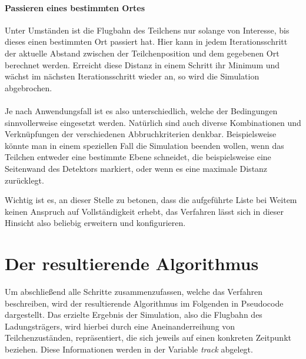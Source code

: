 \paragraph{Passieren eines bestimmten Ortes}
Unter Umst\"anden ist die Flugbahn des Teilchens nur solange von Interesse, bis dieses einen bestimmten Ort passiert hat. Hier
kann in jedem Iterationsschritt der aktuelle Abstand zwischen der Teilchenposition und dem gegebenen Ort berechnet werden.
Erreicht diese Distanz in einem Schritt ihr Minimum und w\"achst im n\"achsten Iterationsschritt wieder an, so wird die
Simulation abgebrochen.
\\
\\
Je nach Anwendungsfall ist es also unterschiedlich, welche der Bedingungen sinnvollerweise eingesetzt werden. Nat\"urlich sind
auch diverse Kombinationen und Verkn\"upfungen der verschiedenen Abbruchkriterien denkbar. Beispielsweise k\"onnte man in einem
speziellen Fall die Simulation beenden wollen, wenn das Teilchen entweder eine bestimmte Ebene schneidet, die beispielsweise eine
Seitenwand des Detektors markiert, oder wenn es eine maximale Distanz zur\"ucklegt.

Wichtig ist es, an dieser Stelle zu betonen, dass die aufgef\"uhrte Liste bei Weitem keinen Anspruch auf Vollst\"andigkeit erhebt,
das Verfahren l\"asst sich in dieser Hinsicht also beliebig erweitern und konfigurieren.

\section{Der resultierende Algorithmus}

Um abschlie{\ss}end alle Schritte zusammenzufassen, welche das Verfahren beschreiben, wird der resultierende Algorithmus im Folgenden
in Pseudocode dargestellt. Das erzielte Ergebnis der Simulation, also die Flugbahn des Ladungstr\"agers, wird hierbei durch eine
Aneinanderreihung von Teilchenzust\"anden, repr\"asentiert, die sich jeweils auf einen konkreten Zeitpunkt beziehen. Diese
Informationen werden in der Variable \textit{track} abgelegt.
\clearpage

